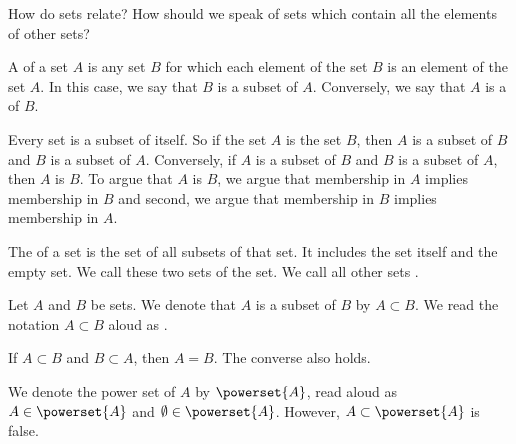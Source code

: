 
\sbasic



\sstart



How do sets relate?
How should we speak
of sets which contain
all the elements of other
sets?


A
of a set $A$ is any set $B$ for
which each element of the set $B$
is an element of the set $A$.
In this case, we say that
$B$ is a subset of $A$.
Conversely, we say that
$A$ is a  of $B$.

Every set is a subset of itself.
So if the set $A$ is the set $B$,
then $A$ is a subset of $B$
and $B$ is a subset of $A$.
Conversely, if $A$ is a
subset of $B$ and $B$ is
a subset of $A$, then $A$ is $B$.
To argue that $A$ is $B$,
we argue that
membership in $A$ implies membership in $B$
and second, we argue that membership in $B$
implies membership in $A$.


The 
of a set is the set of all subsets of that
set.
It includes the set itself and the empty set.
We call these two sets
of the set.
We call all other sets
.


Let $A$ and $B$ be sets.
We denote that $A$ is a subset of $B$ by $A \subset B$.
We read the notation $A \subset B$ aloud as .

If $A \subset B$ and $B \subset A$, then $A = B$.
The converse also holds.

We denote the power set of $A$ by $\powerset{A}$, read aloud as 
$A \in \powerset{A}$ and $\emptyset \in \powerset{A}$.
However, $A \subset \powerset{A}$ is false.

\strats
